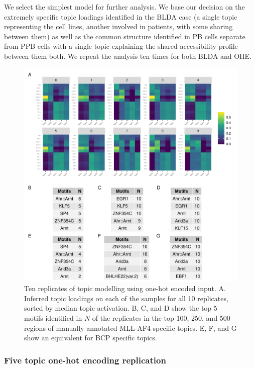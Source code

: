 We select the simplest model for further analysis. We base our decision on the extremely specific topic loadings identified in the BLDA case (a single topic representing the cell lines, another involved in patients, with some sharing between them) as well as the common structure identified in PB cells separate from PPB cells with a single topic explaining the shared accessibility profile between them both. We repeat the analysis ten times for both BLDA and OHE. 

\begin{figure}
    \centering
    \includegraphics[width=\textwidth]{plot/ch5/mll_redo_dummy_reps.pdf}
    \caption{Ten replicates of topic modelling using one-hot encoded input. A. Inferred topic loadings on each of the samples for all 10 replicates, sorted by median topic activation. B, C, and D show the top 5 motifs identified in $N$ of the replicates in the top 100, 250, and 500 regions of manually annotated MLL-AF4 specific topics. E, F, and G show an equivalent for BCP specific topics.}
    \label{fig:mll_redo_topics}
\end{figure}

\subsubsection{Five topic one-hot encoding replication}

